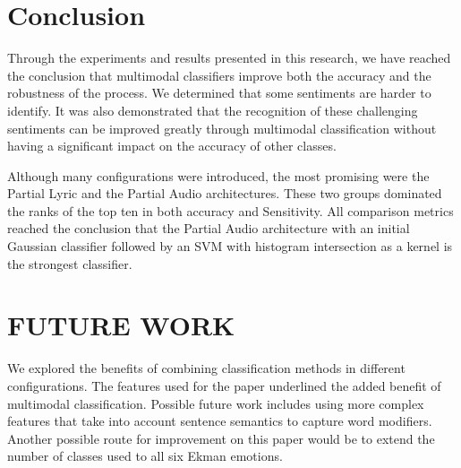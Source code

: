 \chapter{Conclusion}

Through the experiments and results presented in this research, we have reached the conclusion that 
multimodal classifiers improve both the accuracy and the robustness of the process.  We 
determined that some sentiments are harder to identify. It was also demonstrated that the recognition of these
challenging sentiments can be improved greatly through multimodal classification without having a significant 
impact on the accuracy of other classes. 


Although many configurations were introduced, the most promising were the Partial Lyric and the Partial
Audio architectures. These two groups dominated the ranks of the top ten in both accuracy and Sensitivity. 
All comparison metrics reached the conclusion that the Partial Audio architecture with an initial Gaussian classifier followed
by an SVM with histogram intersection as a kernel is the strongest classifier.  



\chapter{FUTURE WORK}
We explored the benefits of combining classification methods in 
different configurations.  The features used for 
the paper underlined the added benefit of multimodal 
classification. Possible future work includes using more complex features that 
take into account sentence semantics to capture word modifiers. Another 
possible route for improvement on this paper would be to extend the number 
of classes used to all six Ekman emotions. 


